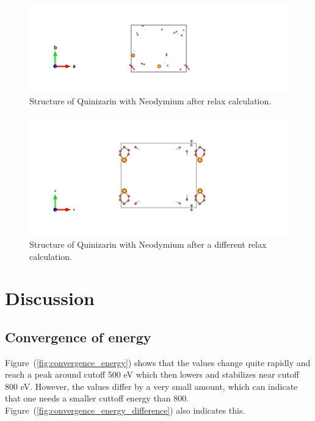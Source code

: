 \documentclass{article}
\begin{document}
      \begin{figure}[H]
        \centering
        \includegraphics[width = \textwidth]{../fig/Nd_relax_CONTCAR.png}
        \caption{Structure of Quinizarin with Neodymium after relax calculation.}
        \label{fig:Nd_relax_CONTCAR}
      \end{figure}

      \begin{figure}[H]
        \centering
        \includegraphics[width = \textwidth]{../fig/Nd_relax_new_CONTCAR.png}
        \caption{Structure of Quinizarin with Neodymium after a different relax calculation.}
        \label{fig:Nd_relax_new_CONTCAR}
      \end{figure}

\vspace{1cm}

\section{Discussion}    \label{sec:Discussion}

  \subsection{Convergence of energy}

    Figure~(\ref{fig:convergence_energy}) shows that the values change quite rapidly and reach a peak around cutoff 500 eV which then lowers and stabilizes near cutoff 800 eV. However, the values differ by a very small amount, which can indicate that one needs a smaller cuttoff energy than 800. Figure~(\ref{fig:convergence_energy_difference}) also indicates this. \\
\end{document}
